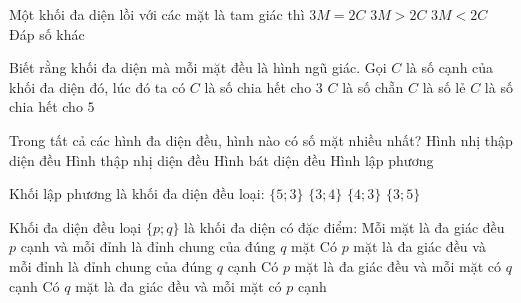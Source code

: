 \begin{ex}%
	Một khối đa diện lồi với các mặt là tam giác thì
	\choice
	{\True $3M=2C$}
	{$3M>2C$}
	{$3M<2C$}
	{Đáp số khác}
\end{ex}
\begin{ex}%
	Biết rằng khối đa diện mà mỗi mặt đều là hình ngũ giác. Gọi $C$ là số cạnh của khối đa diện đó, lúc đó ta có
	\choice
	{$C$ là số chia hết cho $3$}
	{$C$ là số chẵn}
	{$C$ là số lẻ}
	{\True $C$ là số chia hết cho $5$}
\end{ex}
\begin{ex}%
	Trong tất cả các hình đa diện đều, hình nào có số mặt nhiều nhất?
	\choice
	{\True Hình nhị thập diện đều}
	{Hình thập nhị diện đều}
	{Hình bát diện đều}
	{Hình lập phương}
\end{ex}
\begin{ex}%
	Khối lập phương là khối đa diện đều loại: 
	\choice
	{$\{5;3\}$}
	{$\{3;4\}$}
	{\True $\{4;3\}$}
	{$\{3;5\}$}
\end{ex}		
\begin{ex}%
	Khối đa diện đều loại $\{p;q\}$ là khối đa diện có đặc điểm: 
	\choice
	{\True Mỗi mặt là đa giác đều $p$ cạnh và mỗi đỉnh là đỉnh chung của đúng $q$ mặt}
	{Có $p$ mặt là đa giác đều và mỗi đỉnh là đỉnh chung của đúng $q$ cạnh}
	{Có $p$ mặt là đa giác đều và mỗi mặt có $q$ cạnh}
	{Có $q$ mặt là đa giác đều và mỗi mặt có $p$ cạnh}
\end{ex}

